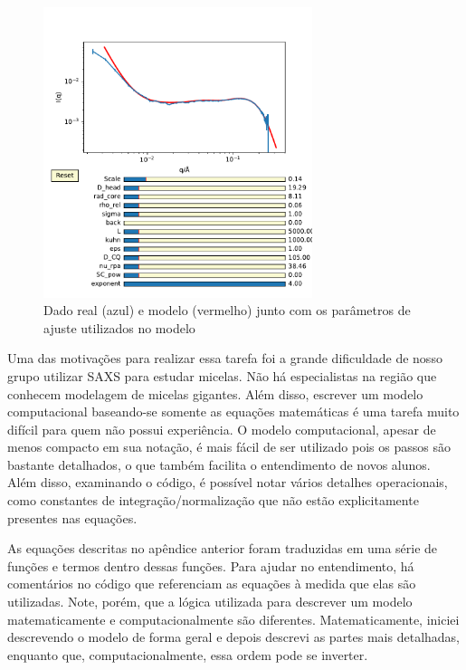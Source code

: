 \begin{apendicesenv}
\begin{figure}[H]
	\centering
	\includegraphics[width=0.7\textwidth]{imagens/saxs/Modelo_dado_SAXS_python}
	\caption{Dado real (azul) e modelo (vermelho) junto com os parâmetros de ajuste utilizados no modelo}
	\label{fig:saxs_modelo_dado_saxs_python}
\end{figure}

Uma das motivações para realizar essa tarefa foi a grande dificuldade de nosso grupo utilizar SAXS para estudar micelas. Não há especialistas na região que conhecem modelagem de micelas gigantes. Além disso, escrever um modelo computacional baseando-se somente as equações matemáticas é uma tarefa muito difícil para quem não possui experiência. O modelo computacional, apesar de menos compacto em sua notação, é mais fácil de ser utilizado pois os passos são bastante detalhados, o que também facilita o entendimento de novos alunos. Além disso, examinando o código, é possível notar vários detalhes operacionais, como constantes de integração/normalização que não estão explicitamente presentes nas equações.

As equações descritas no apêndice anterior foram traduzidas em uma série de funções e termos dentro dessas funções. Para ajudar no entendimento, há comentários no código que referenciam as equações à medida que elas são utilizadas. Note, porém, que a lógica utilizada para descrever um modelo matematicamente e computacionalmente são diferentes. Matematicamente, iniciei descrevendo o modelo de forma geral e depois descrevi as partes mais detalhadas, enquanto que, computacionalmente, essa ordem pode se inverter.


\end{apendicesenv}
